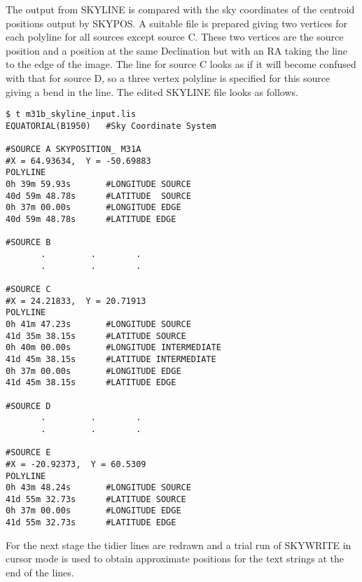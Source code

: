 \documentclass[twoside,11pt]{article}
\begin{document}
The output from SKYLINE is compared with the sky coordinates of the centroid
positions output by SKYPOS. A suitable file is prepared giving two vertices
for each polyline for all sources except source C. These two vertices are the
source position and a position at the same Declination but with an RA taking
the line to the edge of the image. The line for source C looks as if it will
become confused with that for source D, so a three vertex polyline is specified
for this source giving a bend in the line. The edited SKYLINE file looks as
follows.
\begin{small}
\begin{verbatim}
$ t m31b_skyline_input.lis
EQUATORIAL(B1950)   #Sky Coordinate System

#SOURCE A SKYPOSITION_ M31A
#X = 64.93634,  Y = -50.69883
POLYLINE
0h 39m 59.93s       #LONGITUDE SOURCE
40d 59m 48.78s      #LATITUDE  SOURCE
0h 37m 00.00s       #LONGITUDE EDGE
40d 59m 48.78s      #LATITUDE EDGE

#SOURCE B
       .         .        . 
       .         .        . 
 
#SOURCE C
#X = 24.21833,  Y = 20.71913
POLYLINE
0h 41m 47.23s       #LONGITUDE SOURCE
41d 35m 38.15s      #LATITUDE SOURCE
0h 40m 00.00s       #LONGITUDE INTERMEDIATE
41d 45m 38.15s      #LATITUDE INTERMEDIATE
0h 37m 00.00s       #LONGITUDE EDGE
41d 45m 38.15s      #LATITUDE EDGE
 
#SOURCE D
       .         .        . 
       .         .        . 
 
#SOURCE E
#X = -20.92373,  Y = 60.5309
POLYLINE
0h 43m 48.24s       #LONGITUDE SOURCE
41d 55m 32.73s      #LATITUDE SOURCE
0h 37m 00.00s       #LONGITUDE EDGE
41d 55m 32.73s      #LATITUDE EDGE
\end{verbatim}
\end{small}
For the next stage the tidier lines are redrawn and a trial run of SKYWRITE in
cursor mode is used to obtain approximate positions for the text strings at the
end of the lines. 
\end{document}
